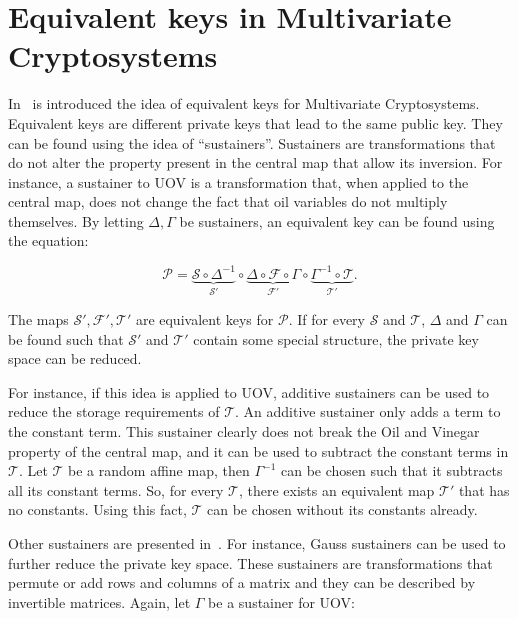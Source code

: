 \documentclass{ufsctex/ufsctex}
\begin{document}
\section{Equivalent keys in Multivariate Cryptosystems}
\label{sec:equivalentkeys}

In~\cite{wolf2005equivalent} is introduced the idea of equivalent keys for
Multivariate Cryptosystems. Equivalent keys are different private keys that
lead to the same public key. They can be found using the idea of
``sustainers''. Sustainers are transformations that do not alter the property
present in the central map that allow its inversion. For instance, a sustainer
to UOV is a transformation that, when applied to the central map, does not
change the fact that oil variables do not multiply themselves. By letting
$\Delta, \Gamma$ be sustainers, an equivalent key can be found using the
equation:

\begin{equation}\label{eq:sustainer}
\mathcal{P} =
\underbrace{\mathcal{S} \circ \Delta^{-1}}_{\mathcal{S'}}
\circ
\underbrace{\Delta \circ \mathcal{F} \circ \Gamma}_{\mathcal{F'}}
\circ
\underbrace{\Gamma^{-1} \circ \mathcal{T}}_{\mathcal{T'}}.
\end{equation}

The maps $\mathcal{S'}, \mathcal{F'}, \mathcal{T'}$ are equivalent keys for
$\mathcal{P}$. If for every $\mathcal{S}$ and $\mathcal{T}$, $\Delta$ and
$\Gamma$ can be found such that $\mathcal{S'}$ and $\mathcal{T'}$ contain some
special structure, the private key space can be reduced.

For instance, if this idea is applied to UOV, additive sustainers can be used
to reduce the storage requirements of $\mathcal{T}$. An additive sustainer only
adds a term to the constant term. This sustainer clearly does not break the Oil
and Vinegar property of the central map, and it can be used to subtract the
constant terms in $\mathcal{T}$. Let $\mathcal{T}$ be a random affine map, then
$\Gamma^{-1}$ can be chosen such that it subtracts all its constant terms. So,
for every $\mathcal{T}$, there exists an equivalent map $\mathcal{T'}$ that has
no constants. Using this fact, $\mathcal{T}$ can be chosen without its
constants already.

Other sustainers are presented in~\cite{wolf2011equivalent}. For instance,
Gauss sustainers can be used to further reduce the private key space. These
sustainers are transformations that permute or add rows and columns of a matrix
and they can be described by invertible matrices. Again, let $\Gamma$ be a
sustainer for UOV:
\end{document}
